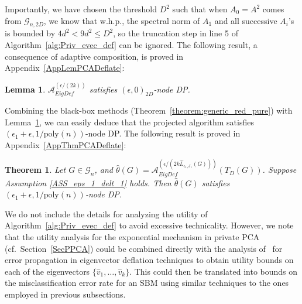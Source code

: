 \documentclass{article}
\newtheorem{theorem}{Theorem}
\newtheorem{lemma}{Lemma}
\newcommand{\thetahat}{\ensuremath{\widehat{\theta}}}
\begin{document}
Importantly, we have chosen the threshold $D^2$ such that when $A_0 = A^2$ comes from $\mathcal{G}_{n, 2D}$, we know that w.h.p., the spectral norm of $A_1$ and all successive $A_i$'s is bounded by $4d^2 < 9d^2 \leq D^2$, so the truncation step in line 5 of Algorithm~\ref{alg:Priv_evec_def} can be ignored. The following result, a consequence of adaptive composition, is proved in Appendix~\ref{AppLemPCADeflate}:

\begin{lemma}
\label{LemPCADeflate}
$\mathcal{A}_{EigDef}^{(\epsilon/(2k))}$ satisfies $(\epsilon, 0)_{2D}$-node DP.
\end{lemma}

Combining the black-box methods (Theorem~\ref{theorem:generic_red_pure}) with Lemma~\ref{LemPCADeflate}, we can easily deduce that the projected algorithm satisfies $(\epsilon_1 + \epsilon, 1/\mathrm{poly}(n))$-node DP. The following result is proved in Appendix~\ref{AppThmPCADeflate}:

\begin{theorem}
\label{ThmPCADeflate}
Let $G \in \mathcal{G}_n$, and $\thetahat(G) = \mathcal{A}_{EigDef}^{(\epsilon/(2k\hat{L}_{\epsilon_1, \delta_1}(G)))}(T_D(G))$. Suppose Assumption \ref{ASS_eps_1_delt_1} holds. Then $\thetahat(G)$ satisfies $(\epsilon_1 + \epsilon, 1/\mathrm{poly}(n))$-node DP.
\end{theorem}

We do not include the details for analyzing the utility of Algorithm~\ref{alg:Priv_evec_def} to avoid excessive technicality. However, we note that the utility analysis for the exponential mechanism in private PCA (cf.\ Section~\ref{SecPPCA}) could be combined directly with the analysis of~\cite{LiaEtal24} for error propagation in eigenvector deflation techniques to obtain utility bounds on each of the eigenvectors $\{\hat{v}_1, \dots, \hat{v}_k\}$. This could then be translated into bounds on the misclassification error rate for an SBM using similar techniques to the ones employed in previous subsections.


\end{document}
